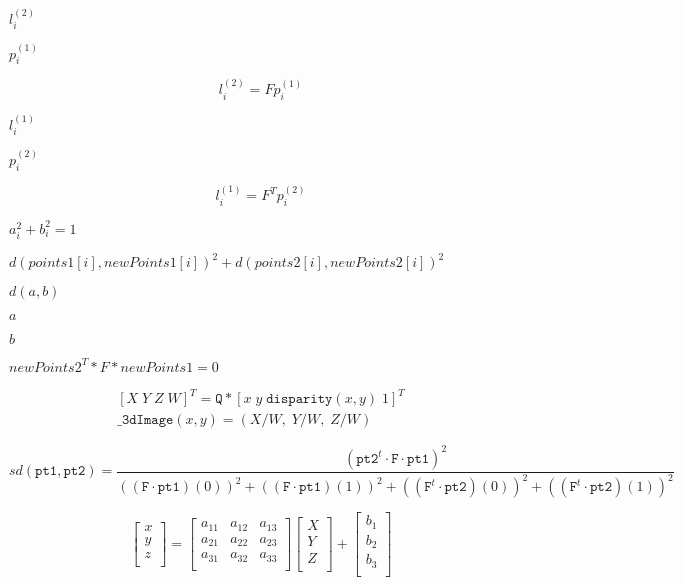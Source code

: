 \documentclass{article}
\begin{document}
$l^{(2)}_i$
\pagebreak

$p^{(1)}_i$
\pagebreak

\[l^{(2)}_i = F p^{(1)}_i\]
\pagebreak

$l^{(1)}_i$
\pagebreak

$p^{(2)}_i$
\pagebreak

\[l^{(1)}_i = F^T p^{(2)}_i\]
\pagebreak

$a_i^2+b_i^2=1$
\pagebreak

$d(points1[i], newPoints1[i])^2 + d(points2[i],newPoints2[i])^2$
\pagebreak

$d(a,b)$
\pagebreak

$a$
\pagebreak

$b$
\pagebreak

$newPoints2^T * F * newPoints1 = 0$
\pagebreak

\[\begin{array}{l} [X \; Y \; Z \; W]^T = \texttt{Q} *[x \; y \; \texttt{disparity} (x,y) \; 1]^T \\ \texttt{\_3dImage} (x,y) = (X/W, \; Y/W, \; Z/W) \end{array}\]
\pagebreak

\[ sd( \texttt{pt1} , \texttt{pt2} )= \frac{(\texttt{pt2}^t \cdot \texttt{F} \cdot \texttt{pt1})^2} {((\texttt{F} \cdot \texttt{pt1})(0))^2 + ((\texttt{F} \cdot \texttt{pt1})(1))^2 + ((\texttt{F}^t \cdot \texttt{pt2})(0))^2 + ((\texttt{F}^t \cdot \texttt{pt2})(1))^2} \]
\pagebreak

\[ \begin{bmatrix} x\\ y\\ z\\ \end{bmatrix} = \begin{bmatrix} a_{11} & a_{12} & a_{13}\\ a_{21} & a_{22} & a_{23}\\ a_{31} & a_{32} & a_{33}\\ \end{bmatrix} \begin{bmatrix} X\\ Y\\ Z\\ \end{bmatrix} + \begin{bmatrix} b_1\\ b_2\\ b_3\\ \end{bmatrix} \]
\pagebreak
\end{document}
